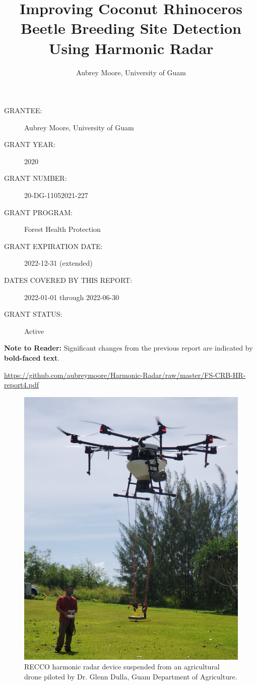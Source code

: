 \documentclass[12pt,letterpaper,english,bibliography=totocnumbered,abstract=on]{scrartcl}
\begin{document}
\titlehead{US Forest Service Forest Health Protection Grant Progess Report 4}
\title{Improving Coconut Rhinoceros Beetle Breeding Site Detection Using Harmonic Radar}
\author{Aubrey Moore, University of Guam}
\maketitle
\begin{description}	
	\item[GRANTEE:] Aubrey Moore, University of Guam 
	\item[GRANT YEAR:] 2020
	\item[GRANT NUMBER:] 20-DG-11052021-227
	\item[GRANT PROGRAM:] Forest Health Protection
	\item[GRANT EXPIRATION DATE:] 2022-12-31 (extended)
	\item[DATES COVERED BY THIS REPORT:] 2022-01-01 through 2022-06-30
	\item[GRANT STATUS:] Active
\end{description}	

\textbf{Note to Reader:} Significant changes from the previous report are indicated by \textbf{bold-faced text}.

\bigskip

\begin{footnotesize}
\url{https://github.com/aubreymoore/Harmonic-Radar/raw/master/FS-CRB-HR-report4.pdf}
\end{footnotesize}


\newpage{}
\tableofcontents{}

\newpage

\begin{figure}
	\centering
	\includegraphics[width=0.7\linewidth]{drone}
	\caption{RECCO harmonic radar device suspended from an agricultural drone piloted by Dr. Glenn Dulla, Guam Department of Agriculture.}
	\label{fig:drone}
\end{figure}
\end{document}
